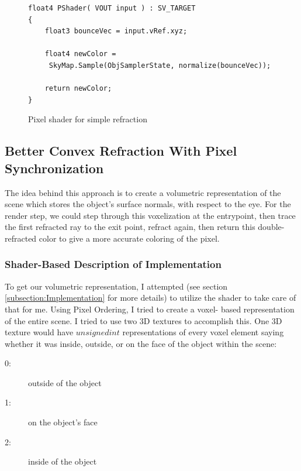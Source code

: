 \documentclass[a4paper, 12pt]{article}
\begin{document}
\begin{figure}[h]
\begin{lstlisting}[breaklines=true,language=HLSL]
float4 PShader( VOUT input ) : SV_TARGET
{	
	float3 bounceVec = input.vRef.xyz;
	
	float4 newColor = 
	 SkyMap.Sample(ObjSamplerState, normalize(bounceVec));
	
	return newColor;
}
\end{lstlisting}

\caption{Pixel shader for simple refraction}
\label{code:PSSimpleRefract}
\end{figure}

\subsection{Better Convex Refraction With Pixel Synchronization}

The idea behind this approach is to create a volumetric representation of the
scene which stores the object's surface normals, with respect to the eye. For
the render step, we could step through this voxelization at the entrypoint,
then trace the first refracted ray to the exit point, refract again, then
return this double-refracted color to give a more accurate coloring of the
pixel.

\subsubsection{Shader-Based Description of Implementation}

To get our volumetric representation, I attempted (see section
\ref{subsection:Implementation} for more details) to utilize the shader to
take care of that for me. Using Pixel Ordering, I tried to create a voxel-
based representation of the entire scene. I tried to use two 3D textures to
accomplish this. One 3D texture would have $unsigned int$ representations of
every voxel element saying whether it was inside, outside, or on the face of
the object within the scene:

\begin{description}
\item[0:] outside of the object
\item[1:] on the object's face
\item[2:] inside of the object
\end{description}
\end{document}
